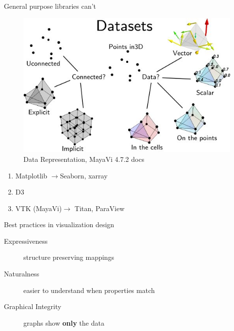 \documentclass[xcolor={dvipsnames}, handout]{beamer}
\begin{document}
\begin{frame}{General purpose libraries can't\cite{toryRethinkingVisualizationHighlevel2004}}
    \begin{figure}
        \includegraphics[height=.5\textheight]{figures/intro/dataset_diagram.png}
        \caption{Data Representation, MayaVi 4.7.2 docs\cite{DataRepresentationMayavi}}
    \end{figure}
    \begin{enumerate}
        \item Matplotlib\cite{hunterMatplotlib2DGraphics2007} $\rightarrow$Seaborn\cite{waskom2020seaborn}, xarray \cite{hoyer2017xarray} 
        \item D3 \cite{bostockDataDrivenDocuments2011}
        \item VTK \cite{hanwellVisualizationToolkitVTK2015,geveci2012vtk}(MayaVi\cite{RamachandranMayaVI2011})$\rightarrow$ Titan\cite{brianwylieUnifiedToolkitInformation2009}, ParaView\cite{ahrens2005paraview}
    \end{enumerate}
\end{frame}

\begin{frame}{Best practices in visualization design}
    \begin{description}
        \item[Expressiveness] structure preserving mappings\cite{mackinlayAutomatingDesignGraphical1986}
        \pause
        \item[Naturalness] easier to understand when properties match\cite{norman_things_smart}
        \pause
       \item[Graphical Integrity] graphs show \textbf{only} the data\cite{tufteVisualDisplayQuantitative2001}
    \end{description}
\end{frame}
\end{document}

